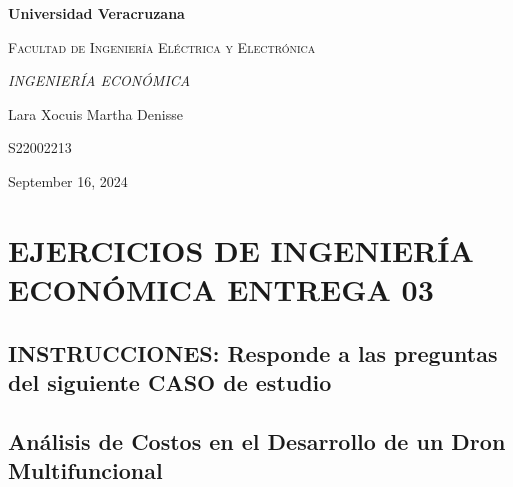 \documentclass[letterpaper,12pt]{article}
\begin{document}
\thispagestyle{empty}
\newpage
\setcounter{page}{1}
\pagestyle{headings}
\begin{sloppypar} 
    \begin{titlepage}
        \hspace{2.5cm}
        {\bfseries\LARGE Universidad Veracruzana \par}
        \hspace{2cm}
        {\scshape\Large Facultad de Ingeniería Eléctrica y Electrónica \par}
        \begin{center}
            \vspace{7cm}
            {\itshape\huge INGENIERÍA ECONÓMICA \par}
            {\large Lara Xocuis Martha Denisse\par}
            {\large S22002213 \par}
            \vfill
            {\Large September 16, 2024 \par}
        \end{center}
    \end{titlepage} 

\section*{EJERCICIOS DE INGENIERÍA ECONÓMICA ENTREGA 03}
\subsection*{INSTRUCCIONES: Responde a las preguntas del siguiente CASO de estudio}
\subsection{Análisis de Costos en el Desarrollo de un Dron Multifuncional}


\end{sloppypar}
\end{document}
